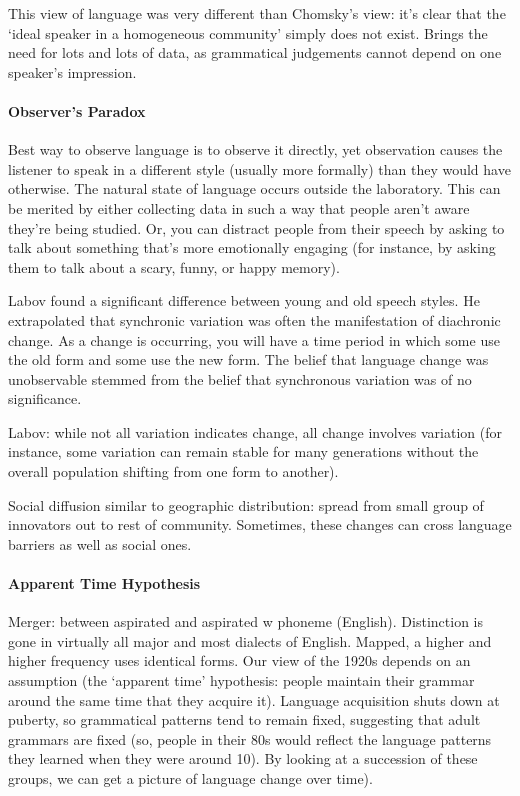 \documentclass{exam}
\begin{document}
This view of language was very different than Chomsky's view: it's clear that the  `ideal speaker in a homogeneous community' simply does not exist. Brings the need for lots and lots of data, as grammatical judgements cannot depend on one speaker's impression. 

\paragraph{Observer's Paradox} Best way to observe language is to observe it directly, yet observation causes the listener to speak in a different style (usually more formally) than they would have otherwise. The natural state of language occurs outside the laboratory. This can be merited by either collecting data in such a way that people aren't aware they're being studied. Or, you can distract people from their speech by asking to talk about something that's more emotionally engaging (for instance, by asking them to talk about a scary, funny, or happy memory). 

Labov found a significant difference between young and old speech styles. He extrapolated that synchronic variation was often the manifestation of diachronic change. As a change is occurring, you will have a time period in which some use the old form and some use the new form. The belief that language change was unobservable stemmed from the belief that synchronous variation was of no significance.

Labov: while not all variation indicates change, all change involves variation (for instance, some variation can remain stable for many generations without the overall population shifting from one form to another). 

Social diffusion similar to geographic distribution: spread from small group of innovators out to rest of community. Sometimes, these changes can cross language barriers as well as social ones.

\paragraph{Apparent Time Hypothesis} Merger: between aspirated and aspirated w phoneme (English). Distinction is gone in virtually all major and most dialects of English. Mapped, a higher and higher frequency uses identical forms. Our view of the 1920s depends on an assumption (the `apparent time' hypothesis: people maintain their grammar around the same time that they acquire it). Language acquisition shuts down at puberty, so grammatical patterns tend to remain fixed, suggesting that adult grammars are fixed (so, people in their 80s would reflect the language patterns they learned when they were around 10). By looking at a succession of these groups, we can get a picture of language change over time). 
\end{document}
